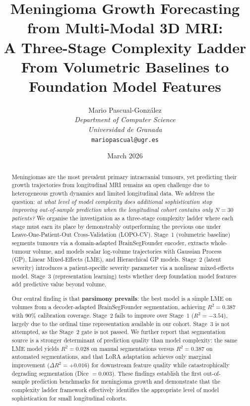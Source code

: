 \documentclass[12pt,a4paper]{article}
\title{%
  \textbf{Meningioma Growth Forecasting from Multi-Modal 3D MRI:\\
  A Three-Stage Complexity Ladder}\\[0.8em]
  \large From Volumetric Baselines to Foundation Model Features
}
\author{%
  Mario Pascual-Gonz\'{a}lez\\
  \textit{Department of Computer Science}\\
  \textit{Universidad de Granada}\\
  \texttt{mariopascual@ugr.es}
}
\date{March 2026}
\begin{document}
\maketitle

\begin{abstract}
Meningiomas are the most prevalent primary intracranial tumours, yet predicting
their growth trajectories from longitudinal MRI remains an open challenge due to
heterogeneous growth dynamics and limited longitudinal data. We address the
question: \emph{at what level of model complexity does additional sophistication
stop improving out-of-sample prediction when the longitudinal cohort contains
only $N = 30$ patients?} We organise the investigation as a three-stage
complexity ladder where each stage must earn its place by demonstrably
outperforming the previous one under Leave-One-Patient-Out Cross-Validation
(LOPO-CV). Stage~1 (volumetric baseline) segments tumours via a
domain-adapted BrainSegFounder encoder, extracts whole-tumour volume, and models
scalar log-volume trajectories with Gaussian Process (GP), Linear Mixed-Effects
(LME), and Hierarchical GP models. Stage~2 (latent severity) introduces a
patient-specific severity parameter via a nonlinear mixed-effects model.
Stage~3 (representation learning) tests whether deep foundation model features
add predictive value beyond volume.

Our central finding is that \textbf{parsimony prevails}: the best model is a
simple LME on volumes from a decoder-adapted BrainSegFounder segmentation,
achieving $R^2 = 0.387$ with 90\% calibration coverage. Stage~2 fails to
improve over Stage~1 ($R^2 = -3.54$), largely due to the ordinal time
representation available in our cohort. Stage~3 is not attempted, as the
Stage~2 gate is not passed. We further report that segmentation source is a
stronger determinant of prediction quality than model complexity: the same LME
model yields $R^2 = 0.028$ on manual segmentations versus $R^2 = 0.387$ on
automated segmentations, and that LoRA adaptation achieves only marginal
improvement ($\Delta R^2 = +0.016$) for downstream feature quality while
catastrophically degrading segmentation (Dice $= 0.003$). These findings
establish the first out-of-sample prediction benchmarks for meningioma growth
and demonstrate that the complexity ladder framework effectively identifies the
appropriate level of model sophistication for small longitudinal cohorts.
\end{abstract}

\newpage
\tableofcontents
\newpage
\end{document}
